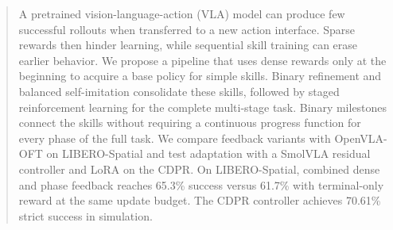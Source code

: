 \begin{abstract}
A pretrained vision-language-action (VLA) model can produce few successful rollouts when transferred to a new action interface. Sparse rewards then hinder learning, while sequential skill training can erase earlier behavior. We propose a pipeline that uses dense rewards only at the beginning to acquire a base policy for simple skills. Binary refinement and balanced self-imitation consolidate these skills, followed by staged reinforcement learning for the complete multi-stage task. Binary milestones connect the skills without requiring a continuous progress function for every phase of the full task. We compare feedback variants with OpenVLA-OFT on LIBERO-Spatial and test adaptation with a SmolVLA residual controller and LoRA on the CDPR. On LIBERO-Spatial, combined dense and phase feedback reaches 65.3\% success versus 61.7\% with terminal-only reward at the same update budget. The CDPR controller achieves 70.61\% strict success in simulation.
\end{abstract}
